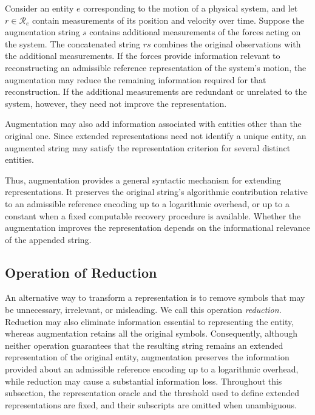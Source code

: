 \begin{example}
Consider an entity $e$ corresponding to the motion of a physical system, and let $r\in\mathcal R_e$ contain measurements of its position and velocity over time. Suppose the augmentation string $s$ contains additional measurements of the forces acting on the system. The concatenated string $rs$ combines the original observations with the additional measurements. If the forces provide information relevant to reconstructing an admissible reference representation of the system's motion, the augmentation may reduce the remaining information required for that reconstruction. If the additional measurements are redundant or unrelated to the system, however, they need not improve the representation.
\end{example}

Augmentation may also add information associated with entities other than the original one. Since extended representations need not identify a unique entity, an augmented string may satisfy the representation criterion for several distinct entities.

Thus, augmentation provides a general syntactic mechanism for extending representations. It preserves the original string's algorithmic contribution relative to an admissible reference encoding up to a logarithmic overhead, or up to a constant when a fixed computable recovery procedure is available. Whether the augmentation improves the representation depends on the informational relevance of the appended string.


\subsection*{Operation of Reduction}

An alternative way to transform a representation is to remove symbols that may be unnecessary, irrelevant, or misleading. We call this operation \emph{reduction}. Reduction may also eliminate information essential to representing the entity, whereas augmentation retains all the original symbols. Consequently, although neither operation guarantees that the resulting string remains an extended representation of the original entity, augmentation preserves the information provided about an admissible reference encoding up to a logarithmic overhead, while reduction may cause a substantial information loss. Throughout this subsection, the representation oracle and the threshold used to define extended representations are fixed, and their subscripts are omitted when unambiguous.

